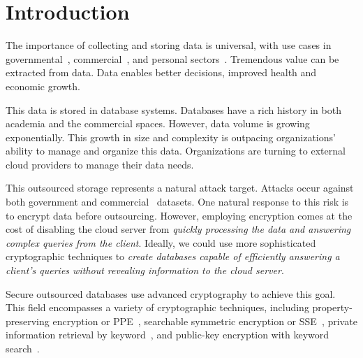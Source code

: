 
\section{Introduction}

The importance of collecting and storing data is universal, with use cases in governmental~\cite{Powers2014}, commercial~\cite{Linoff:2002:MWT:560274,insightdata}, and personal sectors~\cite{Mons2011}.  Tremendous value can be extracted from data.  Data enables better decisions, improved health and economic growth.

This data is stored in database systems.  Databases have a rich history in both academia and the commercial spaces.  However, data volume is growing exponentially.  This growth in size and complexity is outpacing organizations' ability to manage and
organize this data.  Organizations are turning to external cloud providers
to manage their data needs.  

This outsourced storage represents a natural attack target.  Attacks occur against both government \cite{CyberAttacksOPM} and commercial~\cite{CyberAttacks,gressin2017equifax} datasets.
One natural response to this risk is to encrypt data before outsourcing. 
%
However, employing encryption comes at the cost of disabling the cloud server
from {\em quickly processing the data and answering
complex queries from the client}. 
%
Ideally, we could use more sophisticated cryptographic techniques to {\em create databases
capable of efficiently answering a client's queries without revealing
information to the cloud server}.  


Secure outsourced databases use advanced cryptography to achieve this goal.  This field encompasses a variety of cryptographic techniques, including property-preserving encryption or PPE~\cite{EC:PanRou12}, searchable symmetric encryption or SSE~\cite{CCS:CGKO06}, private information retrieval by keyword~\cite{EPRINT:ChoGilNao98}, and public-key encryption with keyword search~\cite{EC:BDOP04}.  

